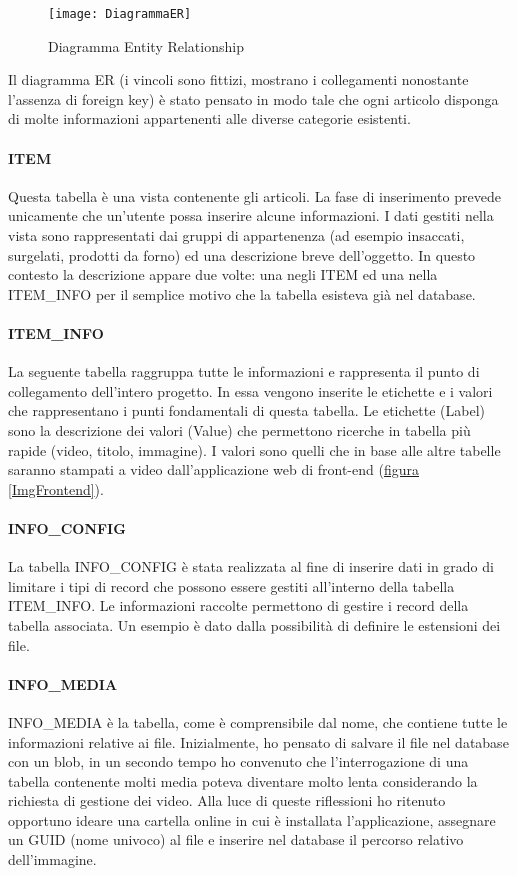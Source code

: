 \begin{figure}[!h] 
	\centering 
	\texttt{[image: DiagrammaER]} 
	\caption{Diagramma Entity Relationship}
	\label{DiagrammaER}
\end{figure}

Il diagramma ER (i vincoli sono fittizi, mostrano i collegamenti nonostante l'assenza di foreign key) è stato pensato in modo tale che ogni articolo disponga di molte informazioni appartenenti alle diverse categorie esistenti.

\paragraph{ITEM}
Questa tabella è una vista contenente gli articoli. La fase di inserimento prevede unicamente che un'utente possa inserire alcune informazioni. I dati gestiti nella vista sono rappresentati dai gruppi di appartenenza (ad esempio insaccati, surgelati, prodotti da forno) ed una descrizione breve dell'oggetto.
In questo contesto la descrizione appare due volte: una negli ITEM ed una nella ITEM\_INFO per il semplice motivo che la tabella esisteva già nel database.

\paragraph{ITEM\_INFO}
La seguente tabella raggruppa tutte le informazioni e rappresenta il punto di collegamento dell'intero progetto. In essa vengono inserite le etichette e i valori che rappresentano i punti fondamentali di questa tabella. Le etichette (Label) sono la descrizione dei valori (Value) che permettono ricerche in tabella più rapide (video, titolo, immagine). I valori sono quelli che in base alle altre tabelle saranno stampati a video dall'applicazione web di front-end (\hyperref[ImgFrontend]{figura \ref{ImgFrontend}}).

\paragraph{INFO\_CONFIG}
La tabella INFO\_CONFIG è stata realizzata al fine di inserire dati in grado di limitare i tipi di record che possono essere gestiti all'interno della tabella ITEM\_INFO. Le informazioni raccolte permettono di gestire i record della tabella associata. Un esempio è dato dalla possibilità di definire le estensioni dei file.

\paragraph{INFO\_MEDIA}
INFO\_MEDIA è la tabella, come è comprensibile dal nome, che contiene tutte le informazioni relative ai file. Inizialmente, ho pensato di salvare il file nel database con un blob, in un secondo tempo ho convenuto che l'interrogazione di una tabella contenente molti media poteva diventare molto lenta considerando la richiesta di gestione dei video. Alla luce di queste riflessioni ho ritenuto opportuno ideare una cartella online in cui è installata l'applicazione, assegnare un GUID (nome univoco) al file e inserire nel database il percorso relativo dell'immagine.


